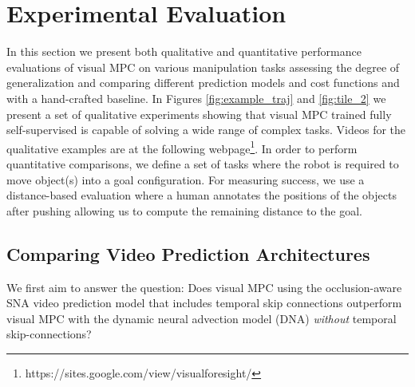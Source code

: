 \section{Experimental Evaluation}
\label{sec:experiments}
In this section we present both qualitative and quantitative  performance evaluations of visual MPC on various manipulation tasks assessing the degree of generalization and comparing different prediction models and cost functions and with a hand-crafted baseline.
In Figures \ref{fig:example_traj} and \ref{fig:tile_2} we present a set of qualitative experiments showing that visual MPC trained fully self-supervised is capable of solving a wide range of complex tasks.
Videos for the qualitative examples are at the following webpage\footnote{https://sites.google.com/view/visualforesight/}.
In order to perform quantitative comparisons, we define a set of tasks where the robot is required to move object(s) into a goal configuration. For measuring success, we use a distance-based evaluation where a human annotates the positions of the objects after pushing allowing us to compute the remaining distance to the goal.

\subsection{Comparing Video Prediction Architectures}
\label{subsec:sna_experiments}
We first aim to answer the question: Does  visual MPC using the occlusion-aware SNA video prediction model that includes temporal skip connections outperform visual MPC with the dynamic neural advection model (DNA)\cite{foresight} \emph{without} temporal skip-connections?

	
